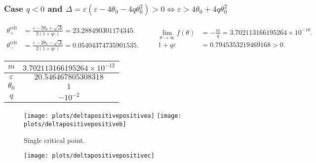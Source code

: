 \documentclass[
    8pt,
    aspectratio=1610,
    c,
    intlimits,
    leqno,
    professionalfonts,
]{beamer}
\begin{document}
\begin{frame}
	\frametitle{Case $q<0$ and
		\begin{math}
			\Delta=
			\varepsilon\left(\varepsilon-4\theta_{0}-4q\theta^{2}_{0}\right)>
			0\iff\varepsilon>4\theta_{0}+4q\theta^{2}_{0}
		\end{math}
	}
	\begin{equation*}
		\begin{aligned}
			\theta^{\text{crit}}_{+} & =
			\frac{
				\varepsilon-2\theta_{0}+\sqrt{\Delta}
			}{
				2\left(1+q\varepsilon\right)
			}=
			23.288490301174345.          \\
			\theta^{\text{crit}}_{-} & =
			\frac{
				\varepsilon-2\theta_{0}-\sqrt{\Delta}
			}{
				2\left(1+q\varepsilon\right)
			}=
			0.05404374735901535.
		\end{aligned}\qquad
		\begin{aligned}
			\lim_{\theta\to\infty}f\left(\theta\right) & =
			-\frac{m}{q}=
			3.702113166195264\times 10^{-10}.              \\
			1+q\varepsilon                             & =
			0.7945353219469168>0.
		\end{aligned}
	\end{equation*}

	\begin{table}[ht!]
		\begin{tabular}{cc}
			\hline
			$m$           & $3.702113166195264\times 10^{-12}$ \\
			\hline
			$\varepsilon$ & $20.546467805308318$               \\
			\hline
			$\theta_{0}$  & $1$                                \\
			\hline
			$q$           & $-10^{-2}$                         \\
			\hline
		\end{tabular}
	\end{table}

	\begin{figure}[ht!]
		\centering
		\texttt{[image: plots/deltapositivepositivea]}
		\texttt{[image: plots/deltapositivepositiveb]}
		\caption{Single critical point.}
	\end{figure}
\end{frame}

\begin{frame}
	\begin{figure}[ht!]
		\centering
		\texttt{[image: plots/deltapositivepositivec]}
	\end{figure}
\end{frame}
\end{document}
